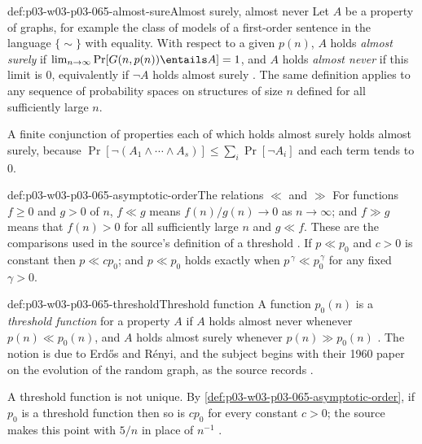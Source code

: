 \begin{hbdefinition}{def:p03-w03-p03-065-almost-sure}{Almost surely, almost never}
Let \(A\) be a property of graphs, for example the class of models of a
first-order sentence in the language \(\{\sim\}\) with equality.  With
respect to a given \(p(n)\), \(A\) holds \emph{almost surely} if
\(\lim_{n\to\infty}\Pr[G(n,p(n))\entails A]=1\), and \(A\) holds
\emph{almost never} if this limit is \(0\), equivalently if \(\neg A\) holds
almost surely \cite[p.~2]{Spencer2007LogicRandomStructuresAuthor}.  The same definition
applies to any sequence of probability spaces on structures of size \(n\)
defined for all sufficiently large \(n\).

A finite conjunction of properties each of which holds almost surely holds
almost surely, because \(\Pr[\neg(A_1\wedge\cdots\wedge A_s)]\leq
\sum_{i}\Pr[\neg A_i]\) and each term tends to \(0\).
\end{hbdefinition}

\begin{hbconvention}{def:p03-w03-p03-065-asymptotic-order}{The relations \(\ll\) and \(\gg\)}
For functions \(f\geq0\) and \(g>0\) of \(n\), \(f\ll g\) means
\(f(n)/g(n)\to0\) as \(n\to\infty\); and \(f\gg g\) means that \(f(n)>0\) for
all sufficiently large \(n\) and \(g\ll f\).  These
are the comparisons used in the source's definition of a threshold
\cite[pp.~2 and 4]{Spencer2007LogicRandomStructuresAuthor}.  If \(p\ll p_0\) and \(c>0\) is
constant then \(p\ll cp_0\); and \(p\ll p_0\) holds exactly when
\(p^{\,\gamma}\ll p_0^{\,\gamma}\) for any fixed \(\gamma>0\).
\end{hbconvention}

\begin{hbdefinition}{def:p03-w03-p03-065-threshold}{Threshold function}
A function \(p_0(n)\) is a \emph{threshold function} for a property \(A\) if
\(A\) holds almost never whenever \(p(n)\ll p_0(n)\), and \(A\) holds almost
surely whenever \(p(n)\gg p_0(n)\) \cite[pp.~2 and 4]{Spencer2007LogicRandomStructuresAuthor}.
The notion is due to Erd\H{o}s and R\'enyi, and the subject begins with their
1960 paper on the evolution of the random graph, as the source records
\cite[p.~4]{Spencer2007LogicRandomStructuresAuthor}.

A threshold function is not unique.  By \cref{def:p03-w03-p03-065-asymptotic-order},
if \(p_0\) is a threshold function then so is \(cp_0\) for every constant
\(c>0\); the source makes this point with \(5/n\) in place of \(n^{-1}\)
\cite[p.~2]{Spencer2007LogicRandomStructuresAuthor}.
\end{hbdefinition}

